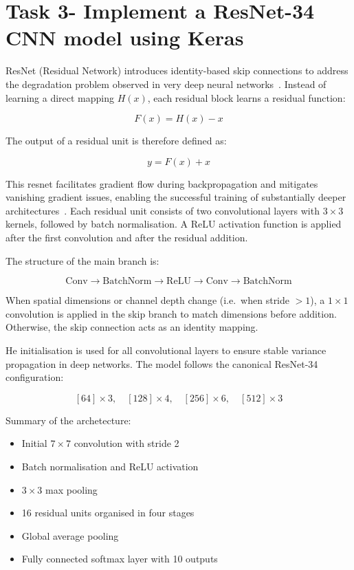 \documentclass[conference]{IEEEtran}
\begin{document}
\section{Task 3- Implement a ResNet-34 CNN model using Keras}
ResNet (Residual Network) introduces identity-based skip connections to address the degradation problem observed in very deep neural networks~\cite{resnet34}. Instead of learning a direct mapping $H(x)$, each residual block learns a residual function:

\[
F(x) = H(x) - x
\]

The output of a residual unit is therefore defined as:

\[
y = F(x) + x
\]

This resnet facilitates gradient flow during backpropagation and mitigates vanishing gradient issues, enabling the successful training of substantially deeper architectures~\cite{resnet34}.
Each residual unit consists of two convolutional layers with $3 \times 3$ kernels, followed by batch normalisation. A ReLU activation function is applied after the first convolution and after the residual addition.

The structure of the main branch is:

\[
\text{Conv} \rightarrow \text{BatchNorm} \rightarrow \text{ReLU} \rightarrow \text{Conv} \rightarrow \text{BatchNorm}
\]

When spatial dimensions or channel depth change (i.e.\ when stride $>1$), a $1 \times 1$ convolution is applied in the skip branch to match dimensions before addition. Otherwise, the skip connection acts as an identity mapping.

He initialisation is used for all convolutional layers to ensure stable variance propagation in deep networks.
The model follows the canonical ResNet-34 configuration:

\[
[64] \times 3,\quad
[128] \times 4,\quad
[256] \times 6,\quad
[512] \times 3
\]

Summary of the archetecture:

\begin{itemize}
    \item Initial $7 \times 7$ convolution with stride 2
    \item Batch normalisation and ReLU activation
    \item $3 \times 3$ max pooling
    \item 16 residual units organised in four stages
    \item Global average pooling
    \item Fully connected softmax layer with 10 outputs
\end{itemize}
\end{document}
